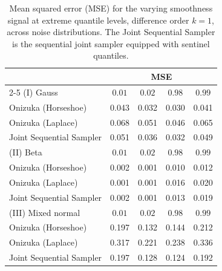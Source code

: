 \begin{table}[htbp]
\centering
\caption{Mean squared error (MSE) for the varying smoothness signal at extreme quantile levels, difference order $k = 1$, across noise distributions. The Joint Sequential Sampler is the sequential joint sampler equipped with sentinel quantiles.}
\label{tab:vs_ext_mse}
\begin{tabular}{lcccc}
\toprule
& \multicolumn{4}{c}{MSE} \\
\cmidrule(lr){2-5}
(I) Gauss & $0.01$ & $0.02$ & $0.98$ & $0.99$ \\
\midrule
Onizuka (Horseshoe)      & 0.043 & 0.032 & 0.030 & 0.041 \\
Onizuka (Laplace)        & 0.068 & 0.051 & 0.046 & 0.065 \\
Joint Sequential Sampler & 0.051 & 0.036 & 0.032 & 0.049 \\
\midrule
(II) Beta & $0.01$ & $0.02$ & $0.98$ & $0.99$ \\
\midrule
Onizuka (Horseshoe)      & 0.002 & 0.001 & 0.010 & 0.012 \\
Onizuka (Laplace)        & 0.001 & 0.001 & 0.016 & 0.020 \\
Joint Sequential Sampler & 0.002 & 0.001 & 0.013 & 0.019 \\
\midrule
(III) Mixed normal & $0.01$ & $0.02$ & $0.98$ & $0.99$ \\
\midrule
Onizuka (Horseshoe)      & 0.197 & 0.132 & 0.144 & 0.212 \\
Onizuka (Laplace)        & 0.317 & 0.221 & 0.238 & 0.336 \\
Joint Sequential Sampler & 0.197 & 0.128 & 0.124 & 0.192 \\
\bottomrule
\end{tabular}
\end{table}

